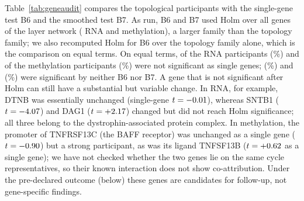 Table~\ref{tab:geneaudit} compares the topological participants with the single-gene test B6 and the smoothed test B7. As run, B6 and B7 used Holm over all genes of the layer network (\audNetRna{} RNA and \audNetMeth{} methylation), a larger family than the topology family; we also recomputed Holm for B6 over the topology family alone, which is the comparison on equal terms. On equal terms, \audNotBsixfRna{} of the \audTopoRna{} RNA participants (\audNotBsixfPctRna\%) and \audNotBsixfMeth{} of the \audTopoMeth{} methylation participants (\audNotBsixfPctMeth\%) were not significant as single genes; \audNotBothRna{} (\audNotBothPctRna\%) and \audNotBothMeth{} (\audNotBothPctMeth\%) were significant by neither B6 nor B7. A gene that is not significant after Holm can still have a substantial but variable change. In RNA, for example, DTNB was essentially unchanged (single-gene $t=-0.01$), whereas SNTB1 ($t=-4.07$) and DAG1 ($t=+2.17$) changed but did not reach Holm significance; all three belong to the dystrophin-associated protein complex. In methylation, the promoter of TNFRSF13C (the BAFF receptor) was unchanged as a single gene ($t=-0.90$) but a strong participant, as was its ligand TNFSF13B ($t=+0.62$ as a single gene); we have not checked whether the two genes lie on the same cycle representatives, so their known interaction does not show co-attribution. Under the pre-declared outcome (below) these genes are candidates for follow-up, not gene-specific findings.

\begin{table}[t]
\centering\small
\caption{Topological participants compared with the single-gene test (B6) and the neighbourhood-smoothed test (B7), counted from the result files. Holm-significant at 0.05 throughout. ``Family Holm'': Holm recomputed over the topology family only, so that B6 and the topology test are adjusted over the same genes.}
\label{tab:geneaudit}

\end{table}

\begin{table}[t]
\centering\small
\caption{The 15 Holm-significant topological participants with the largest $|t|$ per layer. Positive $t$: on cycles of the higher-change filtration (increased genes); negative: of the lower-change filtration. Single-gene: Holm-significant in the paired single-gene test B6 (Holm over the network genes).}
\label{tab:tcgagenes}

\end{table}

